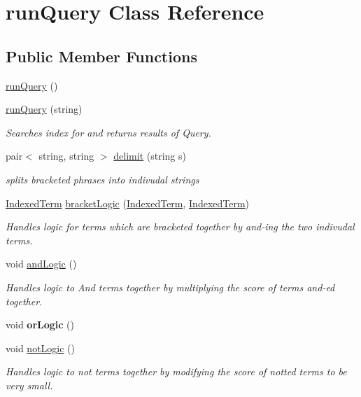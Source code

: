 \hypertarget{classrunQuery}{}\section{run\+Query Class Reference}
\label{classrunQuery}
\subsection*{Public Member Functions}
\begin{DoxyCompactItemize}
\item 
\mbox{\hyperlink{classrunQuery_aaad75dd6d53bfb24bba2ec0b7810f40a}{run\+Query}} ()
\item 
\mbox{\hyperlink{classrunQuery_aaef36fd53a33a7c44ee6ef206779dda9}{run\+Query}} (string)
\begin{DoxyCompactList}\small\item\em Searches index for and returns results of Query. \end{DoxyCompactList}\item 
pair$<$ string, string $>$ \mbox{\hyperlink{classrunQuery_a8bfd9815fef1929543a6b5b200b6a262}{delimit}} (string s)
\begin{DoxyCompactList}\small\item\em splits bracketed phrases into indivudal strings \end{DoxyCompactList}\item 
\mbox{\hyperlink{classIndexedTerm}{Indexed\+Term}} \mbox{\hyperlink{classrunQuery_ad5641a6335515ddeca95c1db2303c9b8}{bracket\+Logic}} (\mbox{\hyperlink{classIndexedTerm}{Indexed\+Term}}, \mbox{\hyperlink{classIndexedTerm}{Indexed\+Term}})
\begin{DoxyCompactList}\small\item\em Handles logic for terms which are bracketed together by and-\/ing the two indivudal terms. \end{DoxyCompactList}\item 
void \mbox{\hyperlink{classrunQuery_a19dcf052ec0adb8c4ed4df0b11094a53}{and\+Logic}} ()
\begin{DoxyCompactList}\small\item\em Handles logic to And terms together by multiplying the score of terms and-\/ed together. \end{DoxyCompactList}\item 
\mbox{\label{classrunQuery_abd6883a84fde9aba285fa3968bdc607c}} 
void {\bfseries or\+Logic} ()
\item 
\mbox{\label{classrunQuery_ad34874f4e2d31ee29279a4b89faaae3b}} 
void \mbox{\hyperlink{classrunQuery_ad34874f4e2d31ee29279a4b89faaae3b}{not\+Logic}} ()
\begin{DoxyCompactList}\small\item\em Handles logic to not terms together by modifying the score of notted terms to be very small. \end{DoxyCompactList}\end{DoxyCompactItemize}


